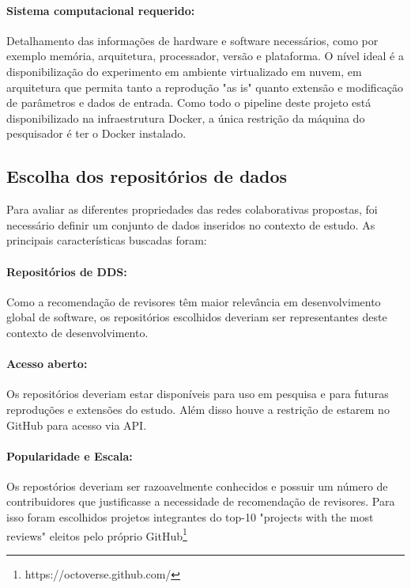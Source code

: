 \documentclass[sigconf]{acmart}
\begin{document}
\paragraph{Sistema computacional requerido:} Detalhamento das informações de hardware e software necessários, como por exemplo memória, arquitetura, processador, versão e plataforma. O nível ideal é a disponibilização do experimento em ambiente virtualizado em nuvem, em arquitetura que permita tanto a reprodução "as is" quanto extensão e modificação de parâmetros e dados de entrada. Como todo o pipeline deste projeto está disponibilizado na infraestrutura Docker, a única restrição da máquina do pesquisador é ter o Docker instalado.

\subsection{Escolha dos repositórios de dados}

Para avaliar as diferentes propriedades das redes colaborativas propostas, foi necessário definir um conjunto de dados inseridos no contexto de estudo. As principais características buscadas foram:

\paragraph{Repositórios de DDS:} Como a recomendação de revisores têm maior relevância em desenvolvimento global de software, os repositórios escolhidos deveriam ser representantes deste contexto de desenvolvimento.

\paragraph{Acesso aberto: } Os repositórios deveriam estar disponíveis para uso em pesquisa e para futuras reproduções e extensões do estudo. Além disso houve a restrição de estarem no GitHub para acesso via API.

\paragraph{Popularidade e Escala:} Os repostórios deveriam ser razoavelmente conhecidos e possuir um número de contribuidores que justificasse a necessidade de recomendação de revisores. Para isso foram escolhidos projetos integrantes do top-10 "projects with the most reviews" eleitos pelo próprio GitHub\footnote{https://octoverse.github.com/}
\end{document}
